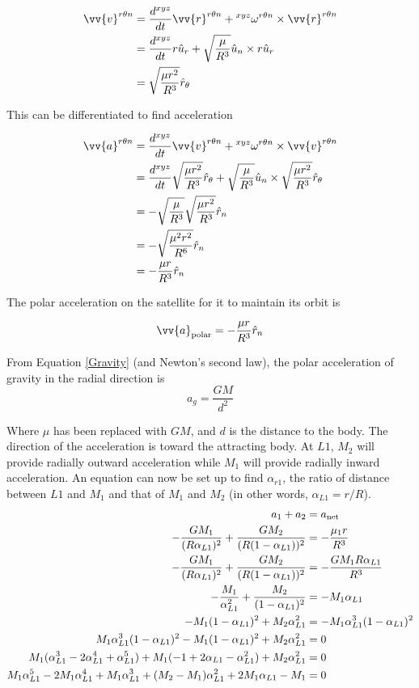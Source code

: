 \documentclass[../basicOrbitalDynamics.tex]{subfiles}
\begin{document}
\begin{align*}
    \vv{v}^{r\theta{}n}&=\frac{d^{xyz}}{dt}{\vv{r}^{r\theta{}n}}+\prescript{xyz}{}{\omega}^{r\theta{}n}\times{}\vv{r}^{r\theta{}n}\\
    &=\frac{d^{xyz}}{dt}{r\hat{u}_r}+\sqrt{\frac{\mu}{R^3}}\hat{u}_n\times r\hat{u}_r\\
    &=\sqrt{\frac{\mu r^2}{R^3}}\hat{r}_\theta\\
\end{align*}

This can be differentiated to find acceleration

\begin{align*}
    \vv{a}^{r\theta{}n}&=\frac{d^{xyz}}{dt}{\vv{v}^{r\theta{}n}}+\prescript{xyz}{}{\omega}^{r\theta{}n}\times{}\vv{v}^{r\theta{}n}\\
    &=\frac{d^{xyz}}{dt}\sqrt{\frac{\mu r^2}{R^3}}\hat{r}_\theta+\sqrt{\frac{\mu}{R^3}}\hat{u}_n\times \sqrt{\frac{\mu r^2}{R^3}}\hat{r}_\theta\\
    &=-\sqrt{\frac{\mu}{R^3}}\sqrt{\frac{\mu r^2}{R^3}}\hat{r}_n\\
    &=-\sqrt{\frac{\mu^2 r^2}{R^6}}\hat{r}_n\\
    &=-\frac{\mu r}{R^3}\hat{r}_n\\
\end{align*}

The polar acceleration on the satellite for it to maintain its orbit is

$$\st{\vv{a}}{polar}=-\frac{\mu r}{R^3}\hat{r}_n$$

From Equation \eqref{Gravity} (and Newton's second law), the polar acceleration of gravity in the radial direction is
$$a_g=\frac{GM}{d^2}$$

Where $\mu$ has been replaced with $GM$, and $d$ is the distance to the body. The direction of the acceleration is toward the attracting body. At $L1$, $M_2$ will provide radially outward acceleration while $M_1$ will provide radially inward acceleration. An equation can now be set up to find $\alpha_{r1}$, the ratio of distance between $L1$ and $M_1$ and that of $M_1$ and $M_2$ (in other words, $\alpha_{L1}=r/R$).
\begin{align*}
    a_1+a_2&={a}_\text{net}\\
    -\frac{GM_1}{(R\alpha_{L1})^2}+\frac{GM_2}{(R(1-\alpha_{L1}))^2} &= -\frac{\mu_1 r}{R^3}\\
    -\frac{GM_1}{(R\alpha_{L1})^2}+\frac{GM_2}{(R(1-\alpha_{L1}))^2} &= -\frac{GM_1 R\alpha_{L1}}{R^3}\\
    -\frac{M_1}{\alpha_{L1}^2}+\frac{M_2}{(1-\alpha_{L1})^2} &= -M_1\alpha_{L1}\\
    -M_1(1-\alpha_{L1})^2+M_2\alpha_{L1}^2 &= -M_1\alpha_{L1}^3(1-\alpha_{L1})^2\\
    M_1\alpha_{L1}^3(1-\alpha_{L1})^2-M_1(1-\alpha_{L1})^2+M_2\alpha_{L1}^2 &= 0\\
    M_1(\alpha_{L1}^3-2\alpha_{L1}^4+\alpha_{L1}^5)+M_1(-1+2\alpha_{L1}-\alpha_{L1}^2)+M_2\alpha_{L1}^2 &= 0\\
    M_1\alpha_{L1}^5-2M_1\alpha_{L1}^4+M_1\alpha_{L1}^3+(M_2-M_1)\alpha_{L1}^2+2M_1\alpha_{L1}-M_1&= 0\\
\end{align*}
\end{document}
